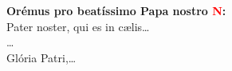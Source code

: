 \textbf{Orémus pro beatíssimo Papa nostro \textcolor{red}{N}:}\\
Pater noster, qui es in c{\ae}lis\ldots\\
\ldots\\
Glória Patri,\ldots